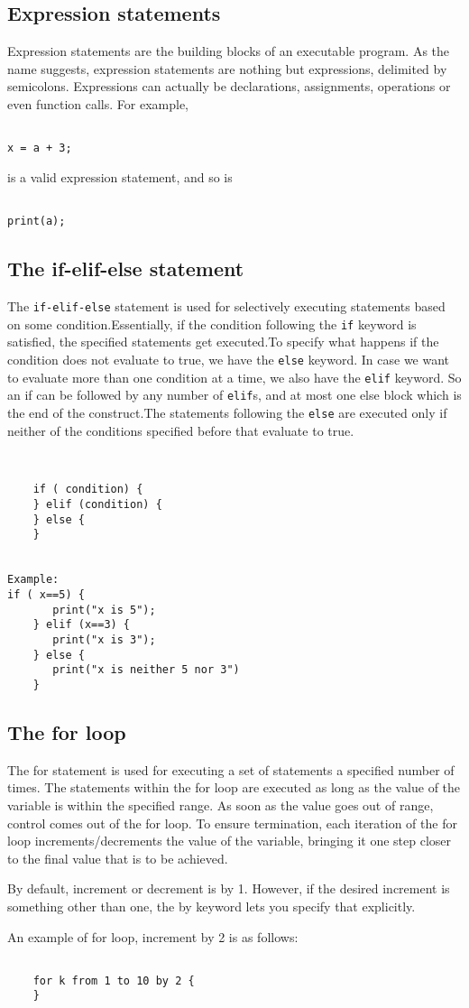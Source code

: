 

\subsection{Expression statements}

Expression statements are the building blocks of an executable program. As the name suggests, expression statements are nothing but expressions, delimited by semicolons. 
Expressions can actually be declarations, assignments, operations or even function calls.
For example,
\begin{lstlisting}

x = a + 3;
\end{lstlisting}
is a valid expression statement, and so is 
\begin{lstlisting}

print(a);
\end{lstlisting}

\subsection{The if-elif-else statement}
The \texttt{if-elif-else} statement is used for selectively executing statements based on some condition.Essentially, if the condition following the \texttt{if} keyword is satisfied, the specified statements get executed.To specify what happens if the condition does not evaluate to true, we have the \texttt{else} keyword.
In case we want to evaluate more than one condition at a time, we also have the \texttt{elif} keyword. So an if can be followed by any number of \texttt{elif}s, and at most one else block which is the end of the construct.The statements following the \texttt{else} are executed only if neither of the conditions specified before that evaluate to true.


\begin{lstlisting}


	if ( condition) {
	} elif (condition) {
	} else {
	}


Example:
if ( x==5) {
       print("x is 5");
	} elif (x==3) {
	   print("x is 3");
	} else {
	   print("x is neither 5 nor 3")
	}
\end{lstlisting}

\subsection{The for loop}

The for statement is used for executing a set of statements a specified number of times.	The statements within the for loop are executed as long as the value of the variable is within the specified range. 
As soon as the value goes out of range, control comes out of the for loop. To ensure termination, each iteration of the for loop increments/decrements the value of the variable, bringing it one step closer to the final value that is to be achieved.

By default, increment or decrement is by 1. However, if the desired increment is something other than one, the by keyword lets you specify that explicitly.

An example of for loop, increment by 2 is as follows: 

\begin{lstlisting}

	for k from 1 to 10 by 2 {
	}
\end{lstlisting}




  